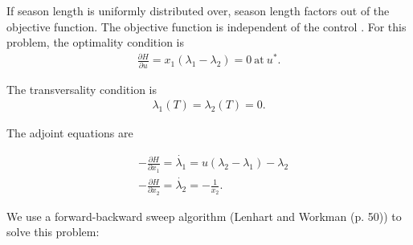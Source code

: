 \documentclass[12pt, oneside]{article}   	%
\begin{document}
If season length is uniformly distributed over, season length factors out of the objective function. The objective function is independent of the control . For this problem, the optimality condition is 
\begin{align}
\frac{\partial H}{\partial u} = x_1(\lambda_1 - \lambda_2) = 0\ \mathrm{at}\ u^*.
\end{align}

The transversality condition is
\begin{align}
\lambda_1(T) = \lambda_2(T) = 0.
\end{align}

The adjoint equations are

\begin{align}
&-\frac{\partial H}{\partial x_1} = \dot{\lambda_1}  = u(\lambda_2 - \lambda_1) - \lambda_2 \nonumber \\
&-\frac{\partial H}{\partial x_2} = \dot{\lambda_2}  = -\frac{ 1 } {x_2}.
\end{align}


We use a forward-backward sweep algorithm (Lenhart and Workman (p. 50)) to solve this problem: 
\end{document}
